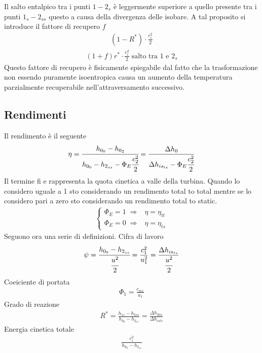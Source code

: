 Il salto entalpico tra i punti $1 - 2_s$ è leggermente superiore a quello presente tra i punti $1_s - 2_{ss}$ questo a causa della divergenza delle isobare. A tal proposito si introduce il fattore di recupero $f$ 
\begin{align*}
(1- R^*) \cdot \frac{c_i^2}{2}
\end{align*}
\begin{align*}
(1+f)r^* \cdot \frac{c_i^2}{2} \; \mbox{salto tra $1$ e $2_s$}
\end{align*}
Questo fattore di recupero è fisicamente spiegabile dal fatto che la trasformazione non essendo puramente isoentropica causa un aumento della temperatura parzialmente recuperabile nell'attraversamento successivo. 

\subsection{Rendimenti}
Il rendimento è il seguente
\begin{align*}
\eta = \cfrac{h_{0_0} - h_{0_2}}{h_{0_0} - h_{2_{ss}} - \Phi_E \cfrac{c_2^2}{2}} = \frac{\Delta h_0}{\Delta h_{is_{ts}}-\Phi_E \cfrac{c_2^2}{2}}
\end{align*}
Il termine fi e rappresenta la quota cinetica a valle della turbina. Quando lo considero uguale a 1 sto considerando un rendimento total to total mentre se lo considero pari a zero sto considerando un rendimento total to static.
\begin{align*}
\begin{cases}
\Phi_E = 1 \; \Rightarrow & \eta = \eta_{tt}\\
\Phi_E = 0 \; \Rightarrow & \eta = \eta_{ts}
\end{cases} 
\end{align*}
Seguono ora una serie di definizioni. Cifra di lavoro
\begin{align*}
\psi = \cfrac{h_{0_0} - h_{2_{ss}}}{\cfrac{u^2}{2}} = \frac{c_1^2}{u_1^2} = \frac{\Delta h_{is_{ts}}}{\cfrac{u^2}{2}}
\end{align*}
Coeiciente di portata
\begin{align*}
\Phi_1 = \frac{c_{m1}}{u_1}
\end{align*}
Grado di reazione
\begin{align*}
R^* = \frac{h_{1s} - h_{2ss}}{h_{0_0} - h_{2_{ss}}} = \frac{\Delta h_{Ris}}{\Delta h_{ists}}
\end{align*}
Energia cinetica totale
\begin{align*}
\frac{c_i^2}{h_{0_0} - h_{2_{ss}}}
\end{align*}
